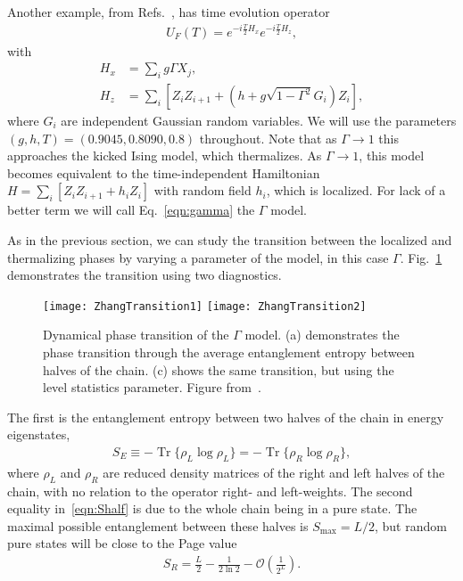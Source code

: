 \documentclass[a4paper,11pt]{article}
\renewcommand{\th}[1]{\frac{1}{#1}}
\newcommand{\nn}{\nonumber\\}
\DeclareMathOperator{\Tr}{Tr}
\begin{document}
Another example, from Refs.~\cite{ZhangFloq, ChenOtoc}, has time evolution operator 
\begin{align}
U_F(T) = e^{-i\frac{T}{2}H_x}e^{-i\frac{T}{2}H_z}, \label{eqn:gamma}
\end{align}
with
\begin{align}
H_x &= \sum_i g\Gamma X_j,\nn
H_z &= \sum_i \left[Z_iZ_{i+1} + (h+g\sqrt{1-\Gamma^2}G_i)Z_i\right],
\end{align}
where $G_i$ are independent Gaussian random variables. We will use the parameters $(g,h,T) = (0.9045,0.8090,0.8)$ throughout.
Note that as $\Gamma\to1$ this approaches the kicked Ising model, which thermalizes. As $\Gamma\to1$, this model becomes equivalent to the time-independent Hamiltonian $H=\sum_i\left[Z_iZ_{i+1} + h_iZ_i\right]$ with random field $h_i$, which is localized. For lack of a better term we will call Eq.~\ref{eqn:gamma} the $\Gamma$ model.

As in the previous section, we can study the transition between the localized and thermalizing phases by varying a parameter of the model, in this case $\Gamma$. Fig.~\ref{fig:floqtrans} demonstrates the transition using two diagnostics. 
\begin{figure}
	\centering
	\texttt{[image: ZhangTransition1]}
	\texttt{[image: ZhangTransition2]}
	\caption{Dynamical phase transition of the $\Gamma$ model. (a) demonstrates the phase transition through the average entanglement entropy between halves of the chain. (c) shows the same transition, but using the level statistics parameter. Figure from~\cite{ZhangFloq}.}
	\label{fig:floqtrans}
\end{figure}
The first is the entanglement entropy between two halves of the chain in energy eigenstates, 
\begin{align}
S_E \equiv -\Tr\{\rho_L\log\rho_L\} = -\Tr\{\rho_R\log\rho_R\},\label{eqn:Shalf}
\end{align}
where $\rho_L$ and $\rho_R$ are reduced density matrices of the right and left halves of the chain, with no relation to the operator right- and left-weights. The second equality in~\ref{eqn:Shalf} is due to the whole chain being in a pure state. The maximal possible entanglement between these halves is $S_\text{max}=L/2$, but random pure states will be close to the Page value~\cite{Page, ZhangTherm}
\begin{align}
S_R = \frac{L}{2} - \th{2\ln 2} -\mathcal{O}\left(\th{2^L}\right).
\end{align}
\end{document}
